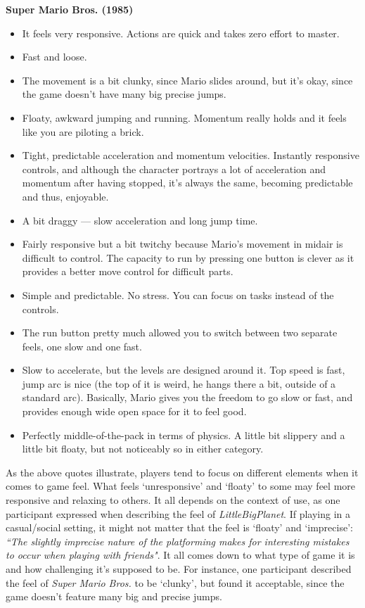 \textbf{Super Mario Bros. (1985)}
\vspace{-5mm}
\begin{itemize}[noitemsep,nolistsep]
\item It feels very responsive. Actions are quick and takes zero effort to master.
\item Fast and loose.
\item The movement is a bit clunky, since Mario slides around, but it's okay, since the game doesn't have many big precise jumps.
\item Floaty, awkward jumping and running. Momentum really holds and it feels like you are piloting a brick.
\item Tight, predictable acceleration and momentum velocities. Instantly responsive controls, and although the character portrays a lot of acceleration and momentum after having stopped, it's always the same, becoming predictable and thus, enjoyable.
\item A bit draggy --- slow acceleration and long jump time.
\item Fairly responsive but a bit twitchy because Mario's movement in midair is difficult to control. The capacity to run by pressing one button is clever as it provides a better move control for difficult parts.
\item Simple and predictable. No stress. You can focus on tasks instead of the controls.
\item The run button pretty much allowed you to switch between two separate feels, one slow and one fast.
\item Slow to accelerate, but the levels are designed around it. Top speed is fast, jump arc is nice (the top of it is weird, he hangs there a bit, outside of a standard arc). Basically, Mario gives you the freedom to go slow or fast, and provides enough wide open space for it to feel good.
\item Perfectly middle-of-the-pack in terms of physics. A little bit slippery and a little bit floaty, but not noticeably so in either category.
\end{itemize}

As the above quotes illustrate, players tend to focus on different elements when it comes to game feel. What feels `unresponsive' and `floaty' to some may feel more responsive and relaxing to others. It all depends on the context of use, as one participant expressed when describing the feel of \textit{LittleBigPlanet}. If playing in a casual/social setting, it might not matter that the feel is `floaty' and `imprecise': \textit{``The slightly imprecise nature of the platforming makes for interesting mistakes to occur when playing with friends"}. It all comes down to what type of game it is and how challenging it's supposed to be. For instance, one participant described the feel of \textit{Super Mario Bros.} to be `clunky', but found it acceptable, since the game doesn't feature many big and precise jumps.